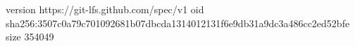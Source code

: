 version https://git-lfs.github.com/spec/v1
oid sha256:3507c0a79c701092681b07dbcda1314012131f6e9db31a9dc3a486cc2ed52bfe
size 354049
